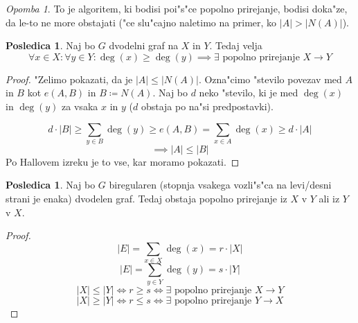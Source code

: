 \documentclass[a4paper,12pt]{article}
\theoremstyle{definition}
\newtheorem{conseq}[counter]{Posledica}
\theoremstyle{remark}
\newtheorem*{rem}{Opomba}
\begin{document}
\begin{rem}
	To je algoritem, ki bodisi poi"s"ce popolno prirejanje, bodisi doka"ze, da le-to ne more obstajati ("ce slu"cajno naletimo na primer, ko $|A| > |N(A)|$).
\end{rem}

\begin{conseq}
	Naj bo $G$ dvodelni graf na $X$ in $Y$. Tedaj velja
	\[ \forall x \in X: \forall y \in Y: \deg(x) \geqslant \deg(y) \implies \exists \text{ popolno prirejanje } X\rightarrow Y \]
\end{conseq}
\begin{proof}
	"Zelimo pokazati, da je $|A| \leqslant |N(A)|$. Ozna"cimo "stevilo povezav med $A$ in $B$ kot $e(A, B)$ in $B \coloneqq N(A)$. Naj bo $d$ neko "stevilo, ki je med $\deg(x)$ in $\deg(y)$ za vsaka $x$ in $y$ ($d$ obstaja po na"si predpostavki).
	
	\[d \cdot |B| \geqslant \sum_{y \in B}\deg(y) \geqslant e(A,B) = \sum_{x\in A}\deg(x) \geqslant d\cdot |A|\]
	\[\implies |A| \leqslant |B|\]
	Po Hallovem izreku je to vse, kar moramo pokazati.
\end{proof}

\begin{conseq}
	Naj bo $G$ biregularen (stopnja vsakega vozli"s"ca na levi/desni strani je enaka) dvodelen graf. Tedaj obstaja popolno prirejanje iz $X$ v $Y$ ali iz $Y$ v $X$.
\end{conseq}
\begin{proof}
	\[ |E| = \sum_{x \in X}\deg(x) = r\cdot |X| \]
	\[ |E| = \sum_{y \in Y}\deg(y) = s\cdot |Y| \]
	\[ |X| \leqslant |Y| \iff r \geqslant s \iff \exists \text{ popolno prirejanje }X\rightarrow Y \]
	\[ |X| \geqslant |Y| \iff r \leqslant s \iff \exists \text{ popolno prirejanje }Y\rightarrow X \]
\end{proof}

\end{document}
